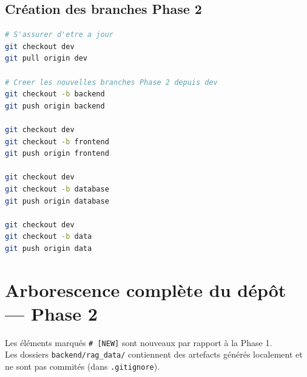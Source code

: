 \documentclass[11pt,a4paper]{article}
\begin{document}
\subsection{Création des branches Phase 2}

\begin{lstlisting}[language=bash, caption=Initialisation des branches Phase 2 depuis dev]
# S'assurer d'etre a jour
git checkout dev
git pull origin dev

# Creer les nouvelles branches Phase 2 depuis dev
git checkout -b backend
git push origin backend

git checkout dev
git checkout -b frontend
git push origin frontend

git checkout dev
git checkout -b database
git push origin database

git checkout dev
git checkout -b data
git push origin data
\end{lstlisting}

\clearpage

\section{Arborescence complète du dépôt — Phase 2}
\label{sec:arborescence}

\begin{info}[Légende]
Les éléments marqués \texttt{\# [NEW]} sont nouveaux par rapport à la Phase 1. \\
Les dossiers \texttt{backend/rag\_data/} contiennent des artefacts générés localement et ne sont pas commités (dans \texttt{.gitignore}).
\end{info}
\end{document}
